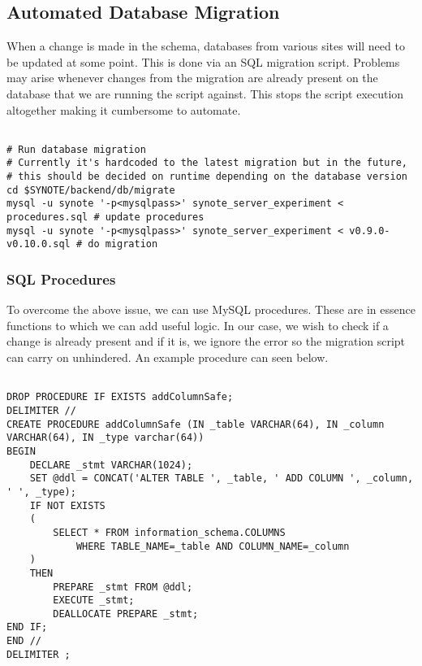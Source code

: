 \subsection{Automated Database Migration}
\label{subsec:automated-database-migration}

When a change is made in the schema, databases from various sites will need to be updated at some point. This is done via an SQL migration script. Problems may arise whenever changes from the migration are already present on the database that we are running the script against. This stops the script execution altogether making it cumbersome to automate.

\begin{listing}[H]
\begin{verbatim}

# Run database migration
# Currently it's hardcoded to the latest migration but in the future,
# this should be decided on runtime depending on the database version
cd $SYNOTE/backend/db/migrate
mysql -u synote '-p<mysqlpass>' synote_server_experiment < procedures.sql # update procedures
mysql -u synote '-p<mysqlpass>' synote_server_experiment < v0.9.0-v0.10.0.sql # do migration

\end{verbatim}
\label{lst:automated-db-migration}
\end{listing}

\subsubsection{SQL Procedures}
\label{subsubsec:sql-procedures}

To overcome the above issue, we can use MySQL procedures. These are in essence functions to which we can add useful logic. In our case, we wish to check if a change is already present and if it is, we ignore the error so the migration script can carry on unhindered. An example procedure can seen below.

\begin{listing}[H]
\begin{verbatim}

DROP PROCEDURE IF EXISTS addColumnSafe;
DELIMITER //
CREATE PROCEDURE addColumnSafe (IN _table VARCHAR(64), IN _column VARCHAR(64), IN _type varchar(64))
BEGIN
	DECLARE _stmt VARCHAR(1024);
	SET @ddl = CONCAT('ALTER TABLE ', _table, ' ADD COLUMN ', _column, ' ', _type);
	IF NOT EXISTS 
	(
		SELECT * FROM information_schema.COLUMNS
			WHERE TABLE_NAME=_table AND COLUMN_NAME=_column
	)
	THEN
		PREPARE _stmt FROM @ddl;
		EXECUTE _stmt;
		DEALLOCATE PREPARE _stmt;
END IF;
END //
DELIMITER ;

\end{verbatim}
\label{lst:sql-procedure}
\end{listing}

